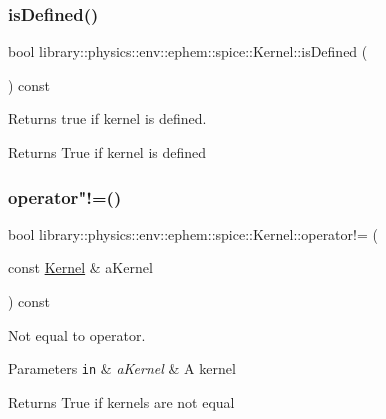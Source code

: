 \subsubsection{\texorpdfstring{is\+Defined()}{isDefined()}}
{\footnotesize\ttfamily bool library\+::physics\+::env\+::ephem\+::spice\+::\+Kernel\+::is\+Defined (\begin{DoxyParamCaption}{ }\end{DoxyParamCaption}) const}



Returns true if kernel is defined. 

\begin{DoxyReturn}{Returns}
True if kernel is defined 
\end{DoxyReturn}
\mbox{\label{classlibrary_1_1physics_1_1env_1_1ephem_1_1spice_1_1_kernel_a33249e0585360e78e1900089a1f26b6a}} 
\subsubsection{\texorpdfstring{operator"!=()}{operator!=()}}
{\footnotesize\ttfamily bool library\+::physics\+::env\+::ephem\+::spice\+::\+Kernel\+::operator!= (\begin{DoxyParamCaption}\item[{const \hyperlink{classlibrary_1_1physics_1_1env_1_1ephem_1_1spice_1_1_kernel}{Kernel} \&}]{a\+Kernel }\end{DoxyParamCaption}) const}



Not equal to operator. 


\begin{DoxyParams}[1]{Parameters}
\mbox{\tt in}  & {\em a\+Kernel} & A kernel \\
\hline
\end{DoxyParams}
\begin{DoxyReturn}{Returns}
True if kernels are not equal 
\end{DoxyReturn}
\mbox{\label{classlibrary_1_1physics_1_1env_1_1ephem_1_1spice_1_1_kernel_a2d491adecb69e25360b4ad2231f10c76}} 
